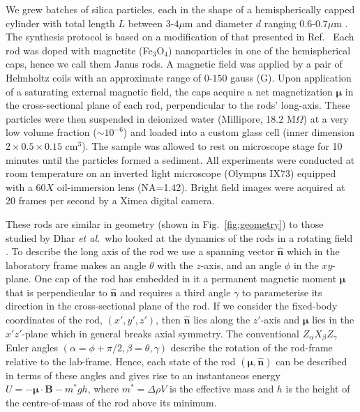 \documentclass[aps,prl,reprint,twocolumn,superscriptaddress,showpacs]{revtex4-1}
\newcommand{\vcrm}[1]{\mathbf{#1}}
\newcommand{\hvcrm}[1]{\mathbf{\hat{#1}}}
\newcommand{\vc}[1]{\boldsymbol{#1}}
\newcommand{\vm}{\vc{\mu}}
\newcommand{\vn}{\hvcrm{n}}
\begin{document}
%
%
%
%
%
%
%
We grew batches of silica particles, each in the shape of a hemispherically capped cylinder with total length $L$ between $3$-$4  \mu$m and diameter $d$ ranging $0.6$-$0.7 \mu$m \cite{Gao15}. The synthesis protocol is based on a modification of that presented in Ref.\ \cite{Kuijk2011} Each rod was doped with magnetite (Fe$_3$O$_4$) nanoparticles in one of the hemispherical caps, hence we call them Janus rods. A magnetic field was applied by a pair of Helmholtz coils with an approximate range of $0$-$150$ gauss (G). Upon application of a saturating external magnetic field, the caps acquire a net magnetization $\vc{\mu}$ in the cross-sectional plane of each rod, perpendicular to the rods' long-axis. These particles were then suspended in deionized water (Millipore, 18.2 M$\Omega$) at a very low volume fraction ($\sim 10^{-6}$) and loaded into a custom glass cell (inner dimension $2\times0.5\times0.15$ cm$^3$). The sample was allowed to rest on microscope stage for 10 minutes until the particles formed a sediment. All experiments were conducted at room temperature on an inverted light microscope (Olympus IX73) equipped with a $60X$ oil-immersion lens (NA=1.42). Bright field images were acquired at 20 frames per second by a Ximea digital camera.

These rods are similar in geometry (shown in Fig.\ \ref{fig:geometry}) to those studied by Dhar \emph{et al.}\ who looked at the dynamics of the rods in a rotating field \cite{Dhar2007}. To describe the long axis of the rod we use a spanning vector $\hvcrm{n}$ which in the laboratory frame makes an angle $\theta$ with the $z$-axis, and an angle $\phi$ in the $xy$-plane. One cap of the rod has embedded in it a permanent magnetic moment $\vc{\mu}$ that is perpendicular to $\hvcrm{n}$ and requires a third angle $\gamma$ to parameterise its direction in the cross-sectional plane of the rod. If we consider the fixed-body coordinates of the rod, $(x',y',z')$, then $\hvcrm{n}$ lies along the $z'$-axis and $\vc{\mu}$ lies in the $x'z'$-plane which in general breaks axial symmetry. The conventional $Z_\alpha X_\beta Z_\gamma$ Euler angles $(\alpha=\phi+\pi/2, \beta=\theta, \gamma)$ describe the rotation of the rod-frame relative to the lab-frame. Hence, each state of the rod $(\vm,\vn)$ can be described in terms of these angles and gives rise to an instantaneos energy $U=-\vc{\mu}\cdot\vcrm{B} - m^*gh$, where $m^*=\Delta\rho V$ is the effective mass and $h$ is the height of the centre-of-mass of the rod above its minimum.
\end{document}
